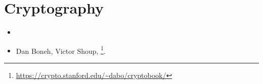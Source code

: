 \section{Cryptography}

\begin{itemize}
\item [\Schneier{}]

\item Dan Boneh, Victor Shoup, \footnote{\AlsoAvailableAs \url{https://crypto.stanford.edu/~dabo/cryptobook/}}.
\end{itemize}

